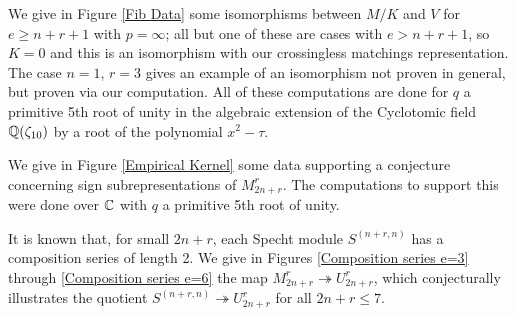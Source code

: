 \documentclass{amsart}
\begin{document}
We give in Figure \ref{Fib Data} some isomorphisms between $M/K$ and $V$ for $e \geq n + r + 1$ with $p = \infty$;
all but one of these are cases with $e > n + r + 1$, so $K=0$ and this is an isomorphism with our crossingless matchings representation.
The case $n = 1$, $r = 3$ gives an example of an isomorphism not proven in general, but proven via our computation.
All of these computations are done for $q$ a primitive 5th root of unity in the algebraic extension of the Cyclotomic field $\mathbb{Q}(\zeta_{10})$ by a root of the polynomial $x^2 - \tau$.

We give in Figure \ref{Empirical Kernel} some data supporting a conjecture concerning sign subrepresentations of $M_{2n + r}^r$.
The computations to support this were done over $\mathbb{C}$ with $q$ a primitive 5th root of unity.

It is known that, for small $2n + r$, each Specht module $S^{(n+r,n)}$ has a composition series of length 2.
We give in Figures \ref{Composition series e=3} through \ref{Composition series e=6} the map $M_{2n + r}^r \twoheadrightarrow U_{2n + r}^r$, which conjecturally illustrates the quotient $S^{(n+r,n)} \twoheadrightarrow U_{2n + r}^r$ for all $2n + r \leq 7$.
\end{document}

